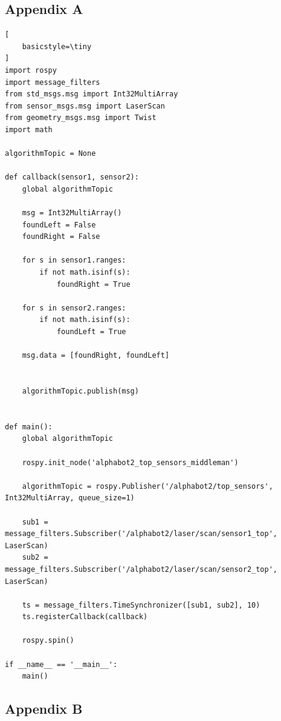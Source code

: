 \documentclass[conference]{IEEEtran}
\begin{document}
\vspace{12pt}

\onecolumn
\appendix
\subsection{Appendix A} \label{appA}

\begin{lstlisting}[
    basicstyle=\tiny
]
import rospy
import message_filters
from std_msgs.msg import Int32MultiArray
from sensor_msgs.msg import LaserScan
from geometry_msgs.msg import Twist
import math

algorithmTopic = None

def callback(sensor1, sensor2):
    global algorithmTopic

    msg = Int32MultiArray()
    foundLeft = False
    foundRight = False

    for s in sensor1.ranges:
        if not math.isinf(s):
            foundRight = True

    for s in sensor2.ranges:
        if not math.isinf(s):
            foundLeft = True

    msg.data = [foundRight, foundLeft]


    algorithmTopic.publish(msg)


def main():
    global algorithmTopic

    rospy.init_node('alphabot2_top_sensors_middleman')

    algorithmTopic = rospy.Publisher('/alphabot2/top_sensors', Int32MultiArray, queue_size=1)

    sub1 = message_filters.Subscriber('/alphabot2/laser/scan/sensor1_top', LaserScan)
    sub2 = message_filters.Subscriber('/alphabot2/laser/scan/sensor2_top', LaserScan)

    ts = message_filters.TimeSynchronizer([sub1, sub2], 10)
    ts.registerCallback(callback)

    rospy.spin()

if __name__ == '__main__':
    main()
\end{lstlisting}

\subsection{Appendix B} \label{appB}
\end{document}

